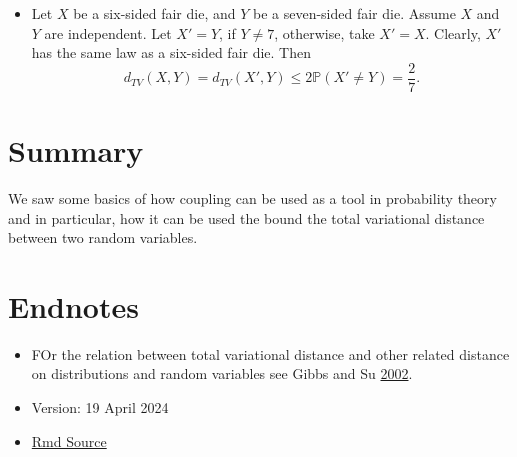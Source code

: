 \documentclass[
]{article}
\providecommand{\tightlist}{%
  \setlength{\itemsep}{0pt}\setlength{\parskip}{0pt}}
\theoremstyle{definition}
\theoremstyle{definition}
\theoremstyle{definition}
\theoremstyle{definition}
\theoremstyle{remark}
\begin{document}
\begin{itemize}
\tightlist
\item
  Let \(X\) be a six-sided fair die, and \(Y\) be a seven-sided fair die. Assume \(X\) and \(Y\) are independent. Let \(X' = Y\), if \(Y \not = 7\), otherwise, take \(X' = X\). Clearly, \(X'\) has the same law as a six-sided fair die. Then
  \[d_{TV}(X, Y)  = d_{TV}(X', Y) \leq 2\mathbb{P}(X' \not= Y )= \frac{2}{7}.\]
\end{itemize}

\hypertarget{summary}{%
\section{Summary}\label{summary}}

We saw some basics of how coupling can be used as a tool in probability theory and in particular, how it can be used the bound the total variational distance between two random variables.

\hypertarget{endnotes}{%
\section{Endnotes}\label{endnotes}}

\begin{itemize}
\tightlist
\item
  FOr the relation between total variational distance and other related distance on distributions and random variables see Gibbs and Su \href{https://www.jstor.org/stable/1403865}{2002}.
\end{itemize}

\begin{itemize}
\tightlist
\item
  Version: 19 April 2024
\item
  \href{https://tsoo-math.github.io/ucl/TV-lec.Rmd}{Rmd Source}
\end{itemize}
\end{document}
